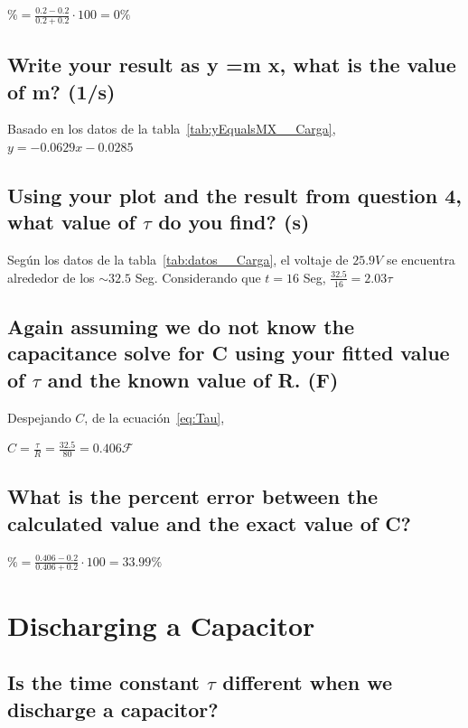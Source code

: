 \documentclass[twocolumn, 12pt]{article}
\begin{document}
$\% = \frac{0.2 - 0.2}{0.2 + 0.2} \cdot 100 = 0\%$

\subsection{Write your result as y =m x, what is the value of m? (1/s)}

Basado en los datos de la tabla~\ref{tab:yEqualsMX__Carga},
$y = -0.0629x -0.0285$

\subsection{Using your plot and the result from question 4, what value of $\tau$ do you find? (s)}

Según los datos de la tabla~\ref{tab:datos__Carga}, el
voltaje de $25.9V$ se encuentra alrededor de los $\sim
    32.5$ Seg. Considerando que $t = 16$ Seg, $\frac{32.5}{16}
    = 2.03 \tau$

\subsection{Again assuming we do not know the capacitance solve for C using your fitted value of $\tau$
    and the known value of R. (F)}

Despejando $C$, de la ecuación~\eqref{eq:Tau},

$C = \frac{\tau}{R} = \frac{32.5}{80} = 0.406 \mathcal{F}$

\subsection{What is the percent error between the calculated value and the exact value of C?}

$\% = \frac{0.406 - 0.2}{0.406 + 0.2} \cdot 100 = 33.99\%$

\section{Discharging a Capacitor}

\subsection{Is the time constant $\tau$ different when we discharge a capacitor?}
\end{document}

